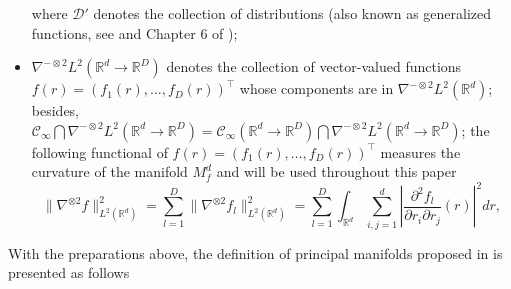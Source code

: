 \documentclass[11pt,reqno]{article}
\newcommand{\T}{\intercal}
\theoremstyle{definition}
\begin{document}
\begin{itemize}
    where $\mathcal{D}'$ denotes the collection of distributions (also known as generalized functions, see \cite{duchon1977splines} and Chapter 6 of \cite{rudin1991functional});
    \item $\nabla^{-\otimes 2}L^2(\mathbb{R}^{d}\rightarrow\mathbb{R}^D)$ denotes the collection of vector-valued functions $f(r)=\left(f_1(r),\ldots,f_D(r)\right)^\T$ whose components are in $\nabla^{-\otimes 2}L^2(\mathbb{R}^{d})$; besides, $\mathcal{C}_\infty\bigcap\nabla^{-\otimes 2}L^2(\mathbb{R}^{d}\rightarrow\mathbb{R}^D)=\mathcal{C}_\infty(\mathbb{R}^{d}\rightarrow\mathbb{R}^D)\bigcap\nabla^{-\otimes 2}L^2(\mathbb{R}^{d}\rightarrow\mathbb{R}^D)$; the following functional of $f(r)=\left(f_1(r),\ldots,f_D(r)\right)^\T$ measures the curvature of the manifold $M_f^d$ and will be used throughout this paper
    \begin{equation}
  \|\nabla^{\otimes 2}f\|_{L^2(\mathbb{R}^{d})}^2 = \sum_{l=1}^{D} \|\nabla^{\otimes 2}f_l\|_{L^2(\mathbb{R}^{d})}^2  = \sum_{l=1}^{D} \int_{\mathbb{R}^{d}}\sum_{i, j = 1}^{d}\left|\frac{\partial^2f_l}{\partial r_i \partial r_j}(r)\right|^2dr, \label{eq:4}
\end{equation}
\end{itemize}
With the preparations above, the definition of principal manifolds proposed in \cite{mengPrincipalManifoldEstimation2021} is presented as follows
\end{document}
